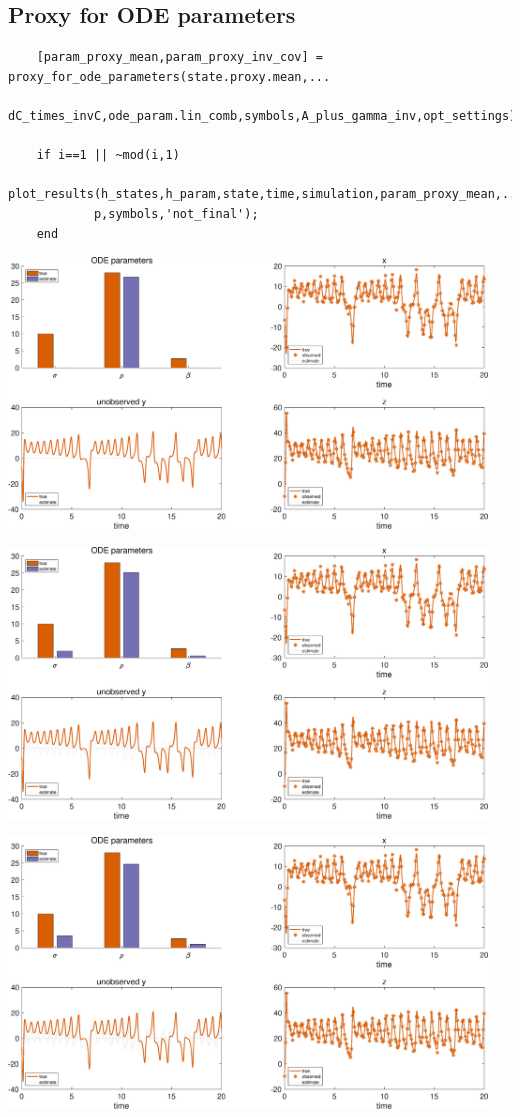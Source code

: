 \subsection{ Proxy for ODE parameters }

\color{RoyalPurple}\begin{verbatim}
    [param_proxy_mean,param_proxy_inv_cov] = proxy_for_ode_parameters(state.proxy.mean,...
        dC_times_invC,ode_param.lin_comb,symbols,A_plus_gamma_inv,opt_settings);

    if i==1 || ~mod(i,1)
        plot_results(h_states,h_param,state,time,simulation,param_proxy_mean,...
            p,symbols,'not_final');
    end
\end{verbatim}
\color{black}

{
\centering
\includegraphics [width=5in]{Lorenz_attractor_4_05.eps}

\includegraphics [width=5in]{Lorenz_attractor_4_06.eps}

\includegraphics [width=5in]{Lorenz_attractor_4_07.eps}

}
